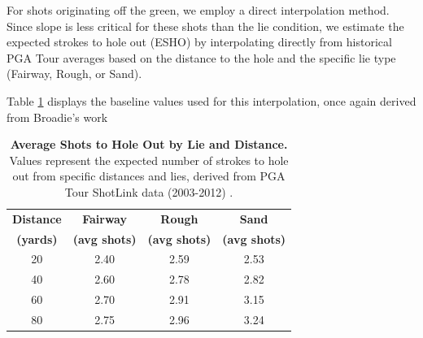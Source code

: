 \documentclass[11pt, letterpaper]{article}
\begin{document}
For shots originating off the green, we employ a direct interpolation method. Since slope is less critical for these shots than the lie condition, we estimate the expected strokes to hole out (ESHO) by interpolating directly from historical PGA Tour averages based on the distance to the hole and the specific lie type (Fairway, Rough, or Sand).

Table \ref{tab:broadie_shortgame} displays the baseline values used for this interpolation, once again derived from Broadie's work \parencite{Broadie_2014a}

\begin{table}[h!]
    \centering
    \small
    \caption{\textbf{Average Shots to Hole Out by Lie and Distance.} Values represent the expected number of strokes to hole out from specific distances and lies, derived from PGA Tour ShotLink data (2003-2012) \parencite{Broadie_2014a}.}
    \label{tab:broadie_shortgame}
    \renewcommand{\arraystretch}{1.2}
    \begin{tabular}{cccc}
        \toprule
        \textbf{Distance} & \textbf{Fairway} & \textbf{Rough} & \textbf{Sand} \\
        \textbf{(yards)} & \textbf{(avg shots)} & \textbf{(avg shots)} & \textbf{(avg shots)} \\
        \midrule
        20 & 2.40 & 2.59 & 2.53 \\
        40 & 2.60 & 2.78 & 2.82 \\
        60 & 2.70 & 2.91 & 3.15 \\
        80 & 2.75 & 2.96 & 3.24 \\
        \bottomrule
    \end{tabular}
\end{table}
\end{document}
